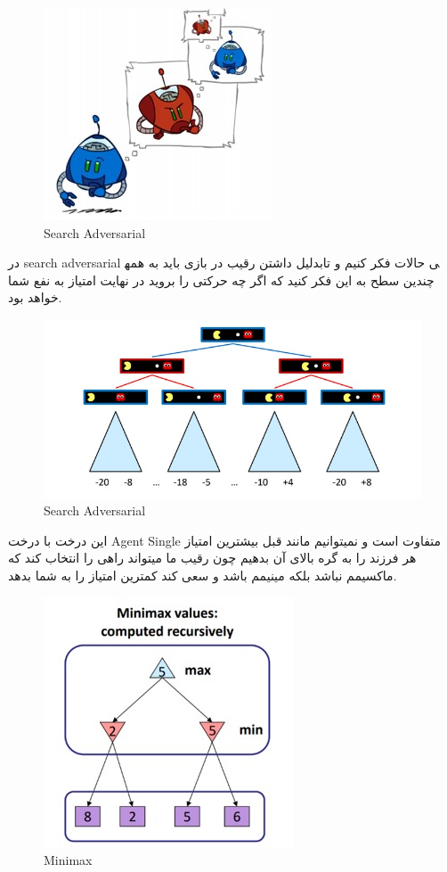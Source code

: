 \begin{figure}[h!]
    \centering
    \includegraphics[width=0.6\linewidth]{images/adversarial01.jpg}
    \caption{Search Adversarial}
\end{figure}

در search adversarial بدلیل داشتن رقیب در بازی  باید به همه‎ی حالات فکر کنیم و تا چندین سطح به این فکر کنید که اگر چه حرکتی را بروید در نهایت امتیاز به نفع شما خواهد بود.

\begin{figure}[h!]
    \centering
    \includegraphics[width=0.8\linewidth]{images/adversarial02.jpg}
    \caption{Search Adversarial}
\end{figure}

این درخت با درخت Agent Single متفاوت است و نمیتوانیم مانند قبل بیشترین امتیاز هر فرزند را به گره بالای آن بدهیم چون رقیب ما میتواند راهی را انتخاب کند که ماکسیمم نباشد بلکه مینیمم باشد و سعی کند کمترین امتیاز را به شما بدهد.


\begin{figure}[h!]
    \centering
    \includegraphics[width=0.4\linewidth]{images/minimax01.jpg}
    \caption{Minimax}
\end{figure}


